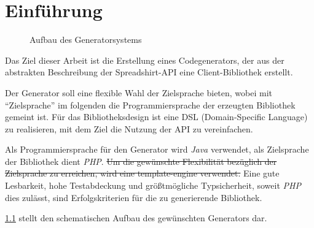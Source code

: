 \chapter{Einführung}


\begin{figure}[b]
    \centering
    \resizebox{\textwidth}{!}{
        
    }
    \caption{Aufbau des Generatorsystems}
    \label{fig:generatorstructure}
\end{figure}        

Das Ziel dieser Arbeit ist die Erstellung eines Codegenerators, der aus der abstrakten Beschreibung der Spreadshirt-API eine Client-Bibliothek erstellt.

Der Generator soll eine flexible Wahl der Zielsprache bieten, wobei mit \enquote{Zielsprache} im folgenden die Programmiersprache der erzeugten Bibliothek gemeint ist. 
Für das Bibliotheksdesign ist eine \gls{DSL} (Domain-Specific Language) zu realisieren, mit dem Ziel die Nutzung der \gls{API} zu vereinfachen. 

Als Programmiersprache für den Generator wird \emph{Java} verwendet, als Zielsprache der Bibliothek dient \emph{PHP}. 
\sout{Um die gewünschte Flexibilität bezüglich der Zielsprache zu erreichen, wird eine \gls{template-engine} verwendet.}
Eine gute Lesbarkeit, hohe Testabdeckung und größtmögliche Typsicherheit, soweit \emph{PHP} dies zulässt, sind Erfolgskriterien für die zu generierende Bibliothek.

\cref{fig:generatorstructure} stellt den schematischen Aufbau des gewünschten Generators dar.




